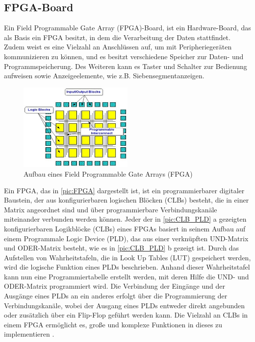 \documentclass[ngerman,12pt]{article} %
\begin{document}
\subsection{FPGA-Board} 
\label{sec:FPGA-Board}
Ein Field Programmable Gate Array (FPGA)-Board, ist ein Hardware-Board, das als Basis ein FPGA besitzt, in dem die Verarbeitung der Daten stattfindet. Zudem weist es eine Vielzahl an Anschlüssen auf, um mit Peripheriegeräten kommunizieren zu können, und es besitzt verschiedene Speicher zur Daten- und Programmspeicherung. Des Weiteren kann es Taster und Schalter zur Bedienung aufweisen sowie Anzeigeelemente, wie z.B. Siebensegmentanzeigen.\newline

\begin{figure} [h!tb]
	\begin{center}
	\includegraphics[width=0.5\textwidth]{FPGA-structure}
	\caption[Aufbau eines Field Programmable Gate Arrays]{\label{pic:FPGA}Aufbau eines Field Programmable Gate Arrays (FPGA) \cite{microcontrollerslab.com}}
	\end{center}
\end{figure}

Ein FPGA, das in \autoref{pic:FPGA} dargestellt ist, ist ein programmierbarer digitaler Baustein, der aus konfigurierbaren logischen Blöcken (CLBs) besteht, die in einer Matrix angeordnet sind und über programmierbare Verbindungskanäle miteinander verbunden werden können. Jeder der in \autoref{pic:CLB_PLD} a gezeigten konfigurierbaren Logikblöcke (CLBs) eines FPGAs basiert in seinem Aufbau auf einem Programmale Logic Device (PLD), das aus einer verknüpften UND-Matrix und ODER-Matrix besteht, wie es in \autoref{pic:CLB_PLD} b gezeigt ist. Durch das Aufstellen von Wahrheitstafeln, die in Look Up Tables (LUT)  gespeichert werden, wird die logische Funktion eines PLDs beschrieben. Anhand dieser Wahrheitstafel kann nun eine Programmiertabelle erstellt werden, mit deren Hilfe die UND- und ODER-Matrix programmiert wird. Die Verbindung der Eingänge und der Ausgänge eines PLDs an ein anderes erfolgt über die Programmierung der Verbindungskanäle, wobei der Ausgang eines PLDs entweder direkt angebunden oder zusätzlich über ein Flip-Flop geführt werden kann. Die Vielzahl an CLBs in einem FPGA ermöglicht es, große und komplexe Funktionen in dieses zu implementieren \cite{Tietze}.\newline %
\end{document}
